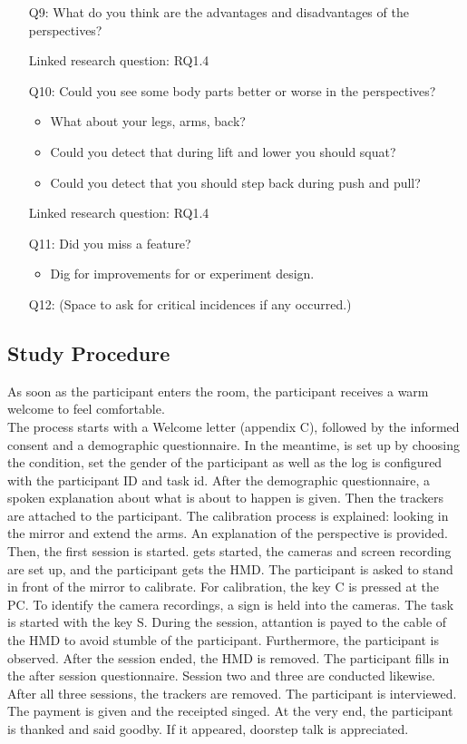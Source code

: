 \begin{itemize}
	\item[Q9:] What do you think are the advantages and disadvantages of the perspectives?
	\item[] Linked research question: RQ1.4
	
	\item[Q10:] Could you see some body parts better or worse in the perspectives?
	\begin{itemize}
		\item What about your legs, arms, back?
		\item Could you detect that during lift and lower you should squat?
		\item Could you detect that you should step back during push and pull?
	\end{itemize}
	\item[] Linked research question: RQ1.4
	
	\item[Q11:] Did you miss a feature?
	\begin{itemize}
		\item Dig for improvements for \exgo or experiment design.
	\end{itemize}
	
	\item[Q12:] (Space to ask for critical incidences if any occurred.)
\end{itemize}


\subsection{Study Procedure}
\label{sec:procedure}
As soon as the participant enters the room, the participant receives a warm welcome to feel comfortable.\\
The process starts with a Welcome letter (appendix C), followed by the informed consent and a demographic questionnaire. In the meantime, \exgo is set up by choosing the condition, set the gender of the participant as well as the log is configured with the participant ID and task id. After the demographic questionnaire, a spoken explanation about what is about to happen is given. Then the trackers are attached to the participant. The calibration process is explained: looking in the mirror and extend the arms. An explanation of the perspective is provided. Then, the first session is started. \exgo gets started, the cameras and screen recording are set up, and the participant gets the HMD. The participant is asked to stand in front of the mirror to calibrate. For calibration, the key C is pressed at the PC. To identify the camera recordings, a sign is held into the cameras. The task is started with the key S. During the session, attantion is payed to the cable of the HMD to avoid stumble of the participant. Furthermore, the participant is observed. After the session ended, the HMD is removed. The participant fills in the after session questionnaire. Session two and three are conducted likewise. After all three sessions, the trackers are removed. The participant is interviewed. The payment is given and the receipted singed. At the very end, the participant is thanked and said goodby. If it appeared, doorstep talk is appreciated.

